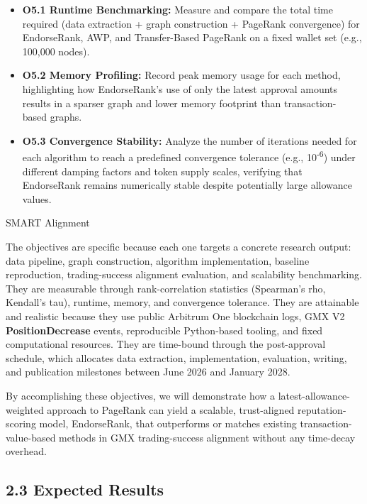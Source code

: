 \begin{itemize}
\item[\textbullet] \textbf{O5.1 Runtime Benchmarking: }Measure and compare the total time required (data extraction + graph construction + PageRank convergence) for EndorseRank, AWP, and Transfer-Based PageRank on a fixed wallet set (e.g., 100,000 nodes).
\item[\textbullet] \textbf{O5.2 Memory Profiling: }Record peak memory usage for each method, highlighting how EndorseRank's use of only the latest approval amounts results in a sparser graph and lower memory footprint than transaction- based graphs.
\item[\textbullet] \textbf{O5.3 Convergence Stability}\textbf{: }Analyze the number of iterations needed for each algorithm to reach a predefined convergence tolerance (e.g., 10\textsuperscript{-}\textsuperscript{6}) under different damping factors and token supply scales, verifying that EndorseRank remains numerically stable despite potentially large allowance values.
\end{itemize}
SMART Alignment


The objectives are specific because each one targets a concrete research output: data pipeline, graph construction, algorithm implementation, baseline reproduction, trading-success alignment evaluation, and scalability benchmarking. They are measurable through rank-correlation statistics (Spearman's rho, Kendall's tau), runtime, memory, and convergence tolerance. They are attainable and realistic because they use public Arbitrum One blockchain logs, GMX V2 \textbf{PositionDecrease} events, reproducible Python-based tooling, and fixed computational resources. They are time-bound through the post-approval schedule, which allocates data extraction, implementation, evaluation, writing, and publication milestones between June 2026 and January 2028.


By accomplishing these objectives, we will demonstrate how a latest-allowance-weighted approach to PageRank can yield a scalable, trust-aligned reputation-scoring model, EndorseRank, that outperforms or matches existing transaction-value-based methods in GMX trading-success alignment without any time-decay overhead.


\subsection*{2.3 Expected Results}
\label{sec:expected-results}

